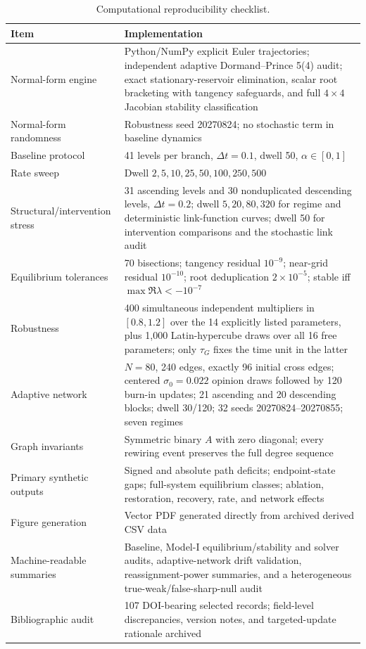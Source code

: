 \documentclass[pdflatex,sn-mathphys-num]{sn-jnl}
\begin{document}
\begin{appendices}
\begin{table}[!htbp]
\centering
\caption{Computational reproducibility checklist.}
\label{tab:reproducibility}
\small
\begin{tabularx}{\textwidth}{|p{3.7cm}|Y|}
\hline
\textbf{Item} & \textbf{Implementation}\\
\hline
Normal-form engine & Python/NumPy explicit Euler trajectories; independent adaptive Dormand--Prince 5(4) audit; exact stationary-reservoir elimination, scalar root bracketing with tangency safeguards, and full $4\times4$ Jacobian stability classification\\
\hline
Normal-form randomness & Robustness seed 20270824; no stochastic term in baseline dynamics\\
\hline
Baseline protocol & 41 levels per branch, $\Delta t=0.1$, dwell 50, $\alpha\in[0,1]$\\
\hline
Rate sweep & Dwell $2,5,10,25,50,100,250,500$\\
\hline
Structural/intervention stress & 31 ascending levels and 30 nonduplicated descending levels, $\Delta t=0.2$; dwell $5,20,80,320$ for regime and deterministic link-function curves; dwell 50 for intervention comparisons and the stochastic link audit\\
\hline
Equilibrium tolerances & 70 bisections; tangency residual $10^{-9}$; near-grid residual $10^{-10}$; root deduplication $2\times10^{-5}$; stable iff $\max\Re\lambda<-10^{-7}$\\
\hline
Robustness & 400 simultaneous independent multipliers in $[0.8,1.2]$ over the 14 explicitly listed parameters, plus 1,000 Latin-hypercube draws over all 16 free parameters; only $\tau_G$ fixes the time unit in the latter\\
\hline
Adaptive network & $N=80$, 240 edges, exactly 96 initial cross edges; centered $\sigma_0=0.022$ opinion draws followed by 120 burn-in updates; 21 ascending and 20 descending blocks; dwell 30/120; 32 seeds 20270824--20270855; seven regimes\\
\hline
Graph invariants & Symmetric binary $A$ with zero diagonal; every rewiring event preserves the full degree sequence\\
\hline
Primary synthetic outputs & Signed and absolute path deficits; endpoint-state gaps; full-system equilibrium classes; ablation, restoration, recovery, rate, and network effects\\
\hline
Figure generation & Vector PDF generated directly from archived derived CSV data\\
\hline
Machine-readable summaries & Baseline, Model-I equilibrium/stability and solver audits, adaptive-network drift validation, reassignment-power summaries, and a heterogeneous true-weak/false-sharp-null audit\\
\hline
Bibliographic audit & 107 DOI-bearing selected records; field-level discrepancies, version notes, and targeted-update rationale archived\\
\hline
\end{tabularx}
\end{table}


\end{appendices}
\end{document}
